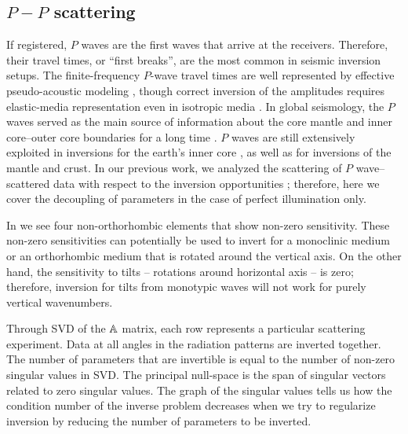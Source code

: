 \subsection{$P-P$ scattering}
%
If registered, $P$ waves are the first waves that arrive at the receivers. Therefore, their travel times, or ``first breaks'', are the most common in seismic inversion setups.  The finite-frequency $P$-wave travel times are well represented by effective pseudo-acoustic 
modeling \citep{alkhalifah2000,wu2017}, though correct inversion of the amplitudes requires elastic-media representation even in isotropic media  
\citep{raknes2014,kurzmann2016}. In global seismology, the $P$ waves served as the main source of information about the core mantle and inner core--outer core boundaries for a long time \citep{bolt1970}. $P$ waves are still extensively exploited in inversions for the earth's inner core \citep{peng2008,yu2016,irving2015}, as well as for inversions of the mantle and crust. 
In our previous work, we analyzed the scattering of $P$ wave--scattered data with respect to the inversion opportunities \citep{kazei2018}; therefore, here we cover the decoupling of parameters in the case of perfect illumination only.

%

In  we see four non-orthorhombic elements that show non-zero 
sensitivity. These non-zero sensitivities can potentially be used to invert for a monoclinic medium or an orthorhombic medium that is rotated around the vertical axis. On the other hand, the sensitivity to tilts -- rotations around horizontal axis -- is zero; therefore, inversion for tilts from monotypic waves will not work for purely 
vertical wavenumbers.

Through SVD of the $\mathbb{A}$ matrix, each row represents a particular 
scattering experiment. Data at all angles in the radiation patterns are inverted 
together.
%
The number of parameters that are invertible is equal to the number of non-zero 
singular values in SVD.
%
The principal null-space is the span of singular vectors related to zero 
singular values. 
%
The graph of the singular values  tells us how the condition number of the 
inverse problem decreases when we try to regularize inversion by reducing the 
number of parameters to be inverted.

